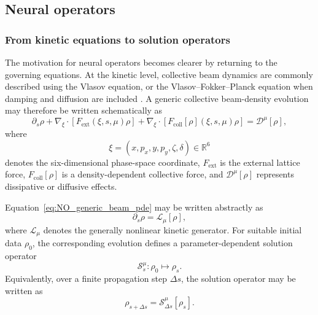 \subsection{Neural operators}
\label{subsec:neural_operators}

\subsubsection{From kinetic equations to solution operators}
\label{subsubsec:pde_solution_operators}

The motivation for neural operators becomes clearer by returning to the governing equations. At the kinetic level, collective beam dynamics are commonly described using the Vlasov equation, or the Vlasov--Fokker--Planck equation when damping and diffusion are included \cite{wiedemann_vlasov_2015,metral_mitigation_2022, schoenfeldt_vfp_2017}. A generic collective beam-density evolution may therefore be written schematically as
\begin{equation}
\partial_s\rho
+
\nabla_{\xi}\cdot
\left[
F_{\mathrm{ext}}(\xi,s,\mu)\rho
\right]
+
\nabla_{\xi}\cdot
\left[
F_{\mathrm{coll}}[\rho](\xi,s,\mu)\rho
\right]
=
\mathcal{D}^{\mu}[\rho],
\label{eq:NO_generic_beam_pde}
\end{equation}
where
\begin{equation}
\xi
=
(x,p_x,y,p_y,\zeta,\delta)
\in\mathbb{R}^{6}
\end{equation}
denotes the six-dimensional phase-space coordinate,
$F_{\mathrm{ext}}$ is the external lattice force,
$F_{\mathrm{coll}}[\rho]$ is a density-dependent collective force,
and $\mathcal{D}^{\mu}[\rho]$ represents dissipative or diffusive effects.

Equation~\eqref{eq:NO_generic_beam_pde} may be written abstractly as
\begin{equation}
\partial_s\rho
=
\mathcal{L}_{\mu}[\rho],
\label{eq:NO_abstract_generator}
\end{equation}
where $\mathcal{L}_{\mu}$ denotes the generally nonlinear kinetic generator. For suitable initial data $\rho_0$, the corresponding evolution defines a parameter-dependent solution operator
\begin{equation}
\mathcal{S}^{\mu}_{s}
:
\rho_0
\longmapsto
\rho_s.
\label{eq:NO_solution_operator}
\end{equation}
Equivalently, over a finite propagation step $\Delta s$, the solution operator may be written as
\begin{equation}
\rho_{s+\Delta s}
=
\mathcal{S}^{\mu}_{\Delta s}[\rho_s].
\label{eq:NO_timestep_operator}
\end{equation}

